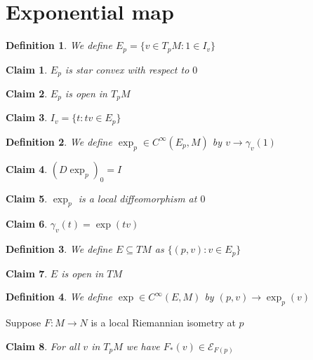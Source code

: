 \documentclass{article}
\newtheorem{definition}{Definition}
\newtheorem{claim}{Claim}
\begin{document}
\section{Exponential map}

\begin{definition}
    We define $E_p =\{v \in T_pM:1 \in I_v\}$
\end{definition}

\begin{claim}
    $E_p$ is star convex with respect to $0$
\end{claim}

\begin{claim}
    $E_p$ is open in $T_pM$
\end{claim}

\begin{claim}
    $I_v=\{t:tv \in E_p\}$
\end{claim}

\begin{definition}
    We define $\exp_p \in C^\infty(E_p,M)$ by $v \to \gamma_v(1)$
\end{definition}

\begin{claim}
    $(D\exp_p)_0=I$
\end{claim}

\begin{claim}
    $\exp_p$ is a local diffeomorphism at $0$
\end{claim}

\begin{claim}
    $\gamma_v(t)=\exp(tv)$
\end{claim} 

\begin{definition}
    We define $E \subseteq TM$ as $\{(p,v): v \in E_p\}$
\end{definition}

\begin{claim}
    $E$ is open in $TM$
\end{claim}

\begin{definition}
    We define $\exp \in C^\infty(E,M)$ by $(p,v) \to \exp_p(v)$
\end{definition}

Suppose $F:M \to N$ is a local Riemannian isometry at $p$

\begin{claim}
  For all $v$ in $T_pM$ we have $F_*(v) \in \mathcal{E}_{F(p)}$
\end{claim}
\end{document}
